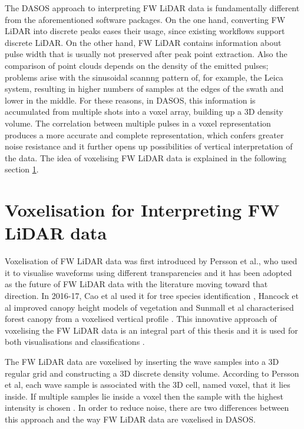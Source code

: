 \documentclass{subfiles}
\begin{document}
	\par The DASOS approach to interpreting FW LiDAR data is fundamentally different from the aforementioned software packages. On the one hand, converting FW LiDAR into discrete peaks eases their usage, since existing workflows support discrete LiDAR.  On the other hand, FW LiDAR contains information about pulse width that is usually not preserved after peak point extraction. Also the comparison of point clouds depends on the density of the emitted pulses; problems arise with the sinusoidal scannng pattern of, for example, the Leica system, resulting in higher numbers of samples at the edges of the swath and lower in the middle. For these reasons, in DASOS, this information is accumulated from multiple shots into a voxel array, building up a 3D density volume. The correlation between multiple pulses in a voxel representation produces a more accurate and complete representation, which confers greater noise resistance and it further opens up possibilities of vertical interpretation of the data. The idea of voxelising FW LiDAR data is explained in the following section \ref{Voxelisation}.  
	
		
	 \section{Voxelisation for Interpreting FW LiDAR data}\label{Voxelisation}
		
	\par Voxelisation of FW LiDAR data was first introduced by Persson et al., who used it to visualise waveforms using different transparencies \cite{Persson2005} and {\color {blue} it has been adopted as the future of FW LiDAR data with the literature moving toward that direction.} In 2016-17, Cao et al used it for tree species identification \cite{Cao2016}, Hancock et al improved canopy height models of vegetation \cite{Hancock2017}  and Sunmall et al characterised forest canopy from a voxelised vertical profile \cite{Sumnall2016}. {\color{blue}This innovative approach of voxelising the FW LiDAR data }is an integral part of this thesis and it is used for both visualisations and classifications \cite{Miltiadou2014}\cite{Miltiadou2015}. 

	\par The FW LiDAR data are voxelised by inserting the wave samples into a 3D regular grid and constructing a 3D discrete density volume. According to Persson et al, each wave sample is associated with the 3D cell, named voxel, that it lies inside. If multiple samples lie inside a voxel then the sample with the highest intensity is chosen \cite{Persson2005}. In order to reduce noise, there are two differences between this approach and the way FW LiDAR data are voxelised in DASOS.
	
\end{document}
